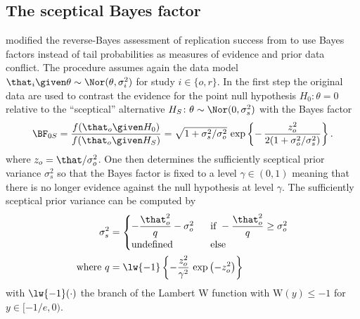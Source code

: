 \begin{subappendices}
\subsection{The sceptical Bayes factor}
\label{sec:BFs}
\citet{Pawel2022b} modified the reverse-Bayes assessment of replication success
from \citet{Held2020} to use Bayes factors \citep{Jeffreys1961, Kass1995}
instead of tail probabilities as measures of evidence and prior data conflict.
The procedure assumes again the data model
$\that_{i} \given \theta \sim \Nor(\theta, \sigma^{2}_{i})$ for study
$i \in \{o, r\}$. In the first step the original data are used to contrast the
evidence for the point null hypothesis $H_{0} \colon \theta = 0$ relative to the
``sceptical'' alternative $H_{S} \colon \theta \sim \Nor(0, \sigma^{2}_{s})$
with the Bayes factor
\begin{align*}
  \BF_{0S}
  = \frac{f(\that_{o} \given H_{0})}{f(\that_{o} \given H_{S})}
  = \sqrt{1 + \sigma^{2}_{s}/\sigma^{2}_{o}} \, \exp\left\{-
  \, \frac{z_{o}^{2}}{2(1 + \sigma^{2}_{o}/\sigma^{2}_{s})}\right\}.
\end{align*}
where $z_{o} = \that/\sigma^{2}_{o}$. One then determines the sufficiently
sceptical prior variance $\sigma^{2}_{s}$ so that the Bayes factor is fixed to a
level $\gamma \in (0, 1)$ meaning that there is no longer evidence against the
null hypothesis at level $\gamma$. The sufficiently sceptical prior variance can
be computed by
\begin{align}
  \label{eq:ssv}
  \sigma^{2}_{s} &=
  \begin{cases}
    -\dfrac{\that_{o}^2}{q} - \sigma^{2}_{o} & ~~ \text{if} ~ -\dfrac{\that_o^2}{q} \geq \sigma^{2}_{o} \\
    \text{undefined} & ~~ \text{else}
  \end{cases} \\
  \text{where} ~ q &= \lw{-1} \left\{-\frac{z_o^2}{\gamma^2} \,
  \exp\left(-z_o^2\right)\right\}
\end{align}
with $\lw{-1}(\cdot)$ the branch of the
Lambert W function with $\text{W}(y) \leq -1$ for $y \in [-1/e, 0)$.


\end{subappendices}
